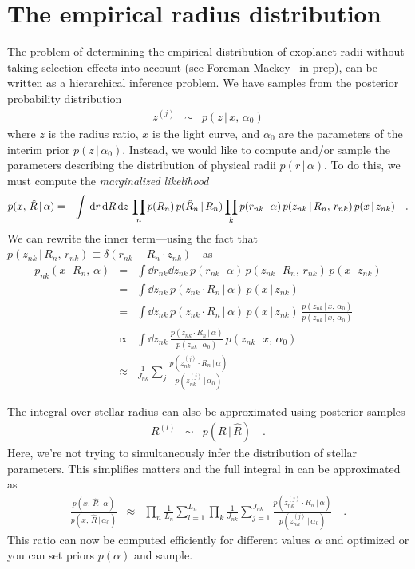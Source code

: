 \documentclass[12pt,preprint]{aastex}
\begin{document}
\section{The empirical radius distribution}

The problem of determining the empirical distribution of exoplanet radii
without taking selection effects into account (see Foreman-Mackey \etal\ in
prep), can be written as a hierarchical inference problem.
We have samples from the posterior probability distribution
\begin{eqnarray}
z^{(j)} &\sim& p(z\,|\,x,\,\alpha_0)
\end{eqnarray}
where $z$ is the radius ratio, $x$ is the light curve, and $\alpha_0$ are the
parameters of the interim prior $p(z\,|\,\alpha_0)$.
Instead, we would like to compute and/or sample the parameters describing the
distribution of physical radii $p(r\,|\,\alpha)$.
To do this, we must compute the \emph{marginalized likelihood}
\begin{eqnarray}\eqlabel{marg-like}
p(x,\,\hat{R}\,|\,\alpha) &=&
    \int \dd r\dd R\dd z\,\prod_n p(R_n)\,p(\hat{R}_n\,|\,R_n)
        \prod_k p(r_{nk}\,|\,\alpha)\,p(z_{nk}\,|\,R_n,\,r_{nk})\,
                p(x\,|\,z_{nk}) \quad.
\end{eqnarray}
We can rewrite the inner term---using the fact that
$p(z_{nk}\,|\,R_n,\,r_{nk})\equiv\delta(r_{nk}-R_n\cdot z_{nk})$---as
\begin{eqnarray}
p_{nk}(x\,|\,R_n,\,\alpha)&=&
\int \dd r_{nk}\dd z_{nk}\,p(r_{nk}\,|\,\alpha)\,p(z_{nk}\,|\,R_n,\,r_{nk})\,
        p(x\,|\,z_{nk}) \nonumber\\
&=&
\int \dd z_{nk}\,p(z_{nk} \cdot R_n\,|\,\alpha)\,p(x\,|\,z_{nk}) \nonumber\\
&=&
\int \dd z_{nk}\,p(z_{nk}\cdot R_n\,|\,\alpha)\,p(x\,|\,z_{nk})\,
\frac{p(z_{nk}\,|\,x,\,\alpha_0)}{p(z_{nk}\,|\,x,\,\alpha_0)} \nonumber\\
&\propto&
\int \dd z_{nk}\,\frac{p(z_{nk}\cdot R_n\,|\,\alpha)}{p(z_{nk}\,|\,\alpha_0)}\,
p(z_{nk}\,|\,x,\,\alpha_0) \nonumber\\
&\approx&
\frac{1}{J_{nk}}
\sum_j \frac{p(z_{nk}^{(j)}\cdot R_n\,|\,\alpha)}{p(z_{nk}^{(j)}\,|\,\alpha_0)}
\end{eqnarray}

The integral over stellar radius can also be approximated using posterior
samples
\begin{eqnarray}
R^{(l)} &\sim& p(R\,|\,\hat{R}) \quad.
\end{eqnarray}
Here, we're not trying to simultaneously infer the distribution of stellar
parameters.
This simplifies matters and the full integral in  can be
approximated as
\begin{eqnarray}
\frac{p(x,\,\hat{R}\,|\,\alpha)}{p(x,\,\hat{R}\,|\,\alpha_0)}
&\approx& \prod_n \frac{1}{L_n} \sum_{l=1}^{L_n} \prod_k
\frac{1}{J_{nk}} \sum_{j=1}^{J_{nk}}
\frac{p(z_{nk}^{(j)}\cdot R_n\,|\,\alpha)}{p(z_{nk}^{(j)}\,|\,\alpha_0)}
\quad.
\end{eqnarray}
This ratio can now be computed efficiently for different values $\alpha$ and
optimized or you can set priors $p(\alpha)$ and sample.
\end{document}
